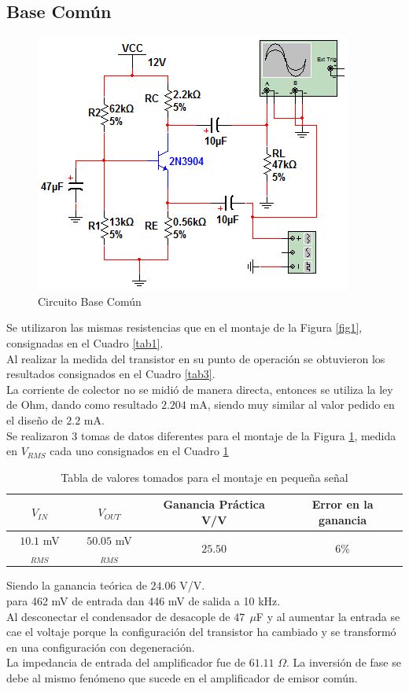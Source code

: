 \documentclass[10pt,graphicx,caption,rotating]{article}
\begin{document}
\subsection{Base Común}
\begin{figure}[H]
	\centering
		\includegraphics[scale=0.7]{base_comun.png}
	\caption{Circuito Base Común}
	\label{fig2}
\end{figure}
\noindent
Se utilizaron las mismas resistencias que en el montaje de la Figura \ref{fig1}, consignadas en el Cuadro \ref{tab1}.\\
Al realizar la medida del transistor en su punto de operación se obtuvieron los resultados consignados en el Cuadro \ref{tab3}.\\
\noindent
La corriente de colector no se midió de manera directa, entonces se utiliza la ley de Ohm, dando como resultado $2.204$ mA, siendo muy similar al valor pedido en el diseño de $2.2$ mA.\\
Se realizaron 3 tomas de datos diferentes para el montaje de la Figura \ref{fig2}, medida en $V_{RMS}$ cada uno consignados en el Cuadro \ref{tab6}
\begin{table}[H]
	\centering
\begin{tabular}[c]{|c|c|c|c|} \hline
$V_{IN}$ & $V_{OUT}$ & \textbf{Ganancia Práctica} V/V & \textbf{Error en la ganancia} \\ \hline
$10.1$ mV$_{RMS}$ & $50.05$ mV$_{RMS}$ & $25.50$ & $6\%$ \\
 \hline
\end{tabular}
	\caption{Tabla de valores tomados para el montaje en pequeña señal}
	\label{tab6}
\end{table}
\noindent
Siendo la ganancia teórica de $24.06$ V/V.\\
para 462 mV de entrada dan 446 mV de salida a 10 kHz.\\
Al desconectar el condensador de desacople de $47\ \ \mu$F y al aumentar la entrada se cae el voltaje porque la configuración del transistor ha cambiado y se transformó en una configuración con degeneración.\\
La impedancia de entrada del amplificador fue de $61.11$ $\Omega$. La inversión de fase se debe al mismo fenómeno que sucede en el amplificador de emisor común.\\
\end{document}
